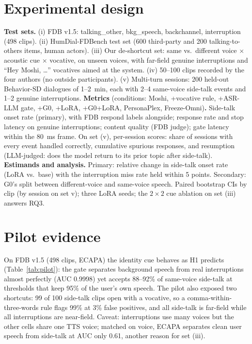 \documentclass[11pt]{article}
\begin{document}
\section{Experimental design}
\textbf{Test sets.} (i) FDB v1.5: talking\_other, bkg\_speech, backchannel, interruption (498 clips). (ii) HumDial-FDBench test set (600 third-party and 200 talking-to-others items, human actors). (iii) Our de-shortcut set: same vs.\ different voice $\times$ acoustic cue $\times$ vocative, on unseen voices, with far-field genuine interruptions and ``Hey Moshi, \ldots'' vocatives aimed at the system. (iv) 50--100 clips recorded by the four authors (no outside participants). (v) Multi-turn sessions: 200 held-out Behavior-SD dialogues of 1--2~min, each with 2--4 same-voice side-talk events and 1--2 genuine interruptions.
\textbf{Metrics} (conditions: Moshi, +vocative rule, +ASR-LLM gate, +G0, +LoRA, +G0+LoRA, PersonaPlex, Freeze-Omni)\textbf{.} Side-talk onset rate (primary), with FDB respond labels alongside; response rate and stop latency on genuine interruptions; content quality (FDB judge); gate latency within the 80~ms frame. On set (v), per-session scores: share of sessions with every event handled correctly, cumulative spurious responses, and resumption (LLM-judged: does the model return to its prior topic after side-talk).
\textbf{Estimands and analysis.} Primary: relative change in side-talk onset rate (LoRA vs.\ base) with the interruption miss rate held within 5 points. Secondary: G0's split between different-voice and same-voice speech. Paired bootstrap CIs by clip (by session on set v); three LoRA seeds; the $2\times2$ cue ablation on set (iii) answers RQ3.

\section{Pilot evidence}
On FDB v1.5 (498 clips, ECAPA) the identity cue behaves as H1 predicts (Table~\ref{tab:pilot}): the gate separates background speech from real interruptions almost perfectly (AUC 0.9998) yet accepts 88--92\% of same-voice side-talk at thresholds that keep 95\% of the user's own speech. The pilot also exposed two shortcuts: 99 of 100 side-talk clips open with a vocative, so a comma-within-three-words rule flags 99\% at 3\% false positives, and all side-talk is far-field while all interruptions are near-field. Caveat: interruptions use many voices but the other cells share one TTS voice; matched on voice, ECAPA separates clean user speech from side-talk at AUC only 0.61, another reason for set (iii).
\end{document}
